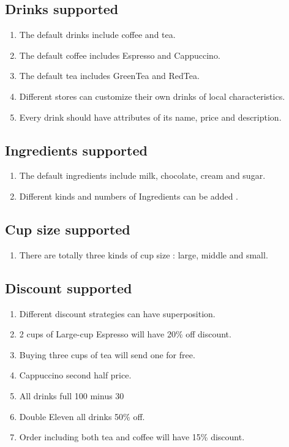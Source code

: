 \documentclass[a4paper]{report}
\begin{document}
\subsection{Drinks supported}
\begin{enumerate}
\item The default drinks include coffee and tea.
\item The default coffee includes Espresso and Cappuccino.
\item The default tea includes GreenTea and RedTea.
\item Different stores can customize their own drinks of local characteristics.
\item Every drink should have attributes of its name, price and description.


\end{enumerate}

\subsection{Ingredients supported}
\begin{enumerate}
\item The default ingredients include milk, chocolate, cream and sugar.
\item Different kinds and numbers of Ingredients can be added .
\end{enumerate}

\subsection{Cup size supported}
\begin{enumerate}
\item There are totally three kinds of cup size : large, middle and small.
\end{enumerate}

\subsection{Discount supported}
\begin{enumerate}
\item Different discount strategies can have superposition.
\item 2 cups of Large-cup Espresso will have 20\% off discount.
\item Buying three cups of tea will send one for free.
\item Cappuccino second half price.
\item All drinks full 100 minus 30
\item Double Eleven all drinks 50\% off.
\item Order including both tea and coffee will have 15\% discount.
\end{enumerate}
\end{document}
